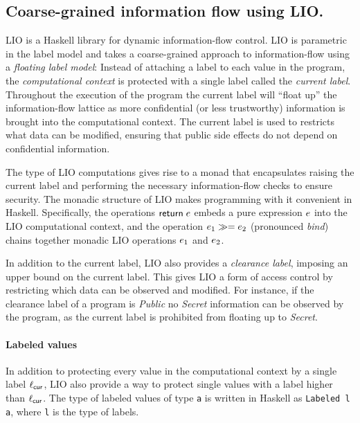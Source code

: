 \subsection{Coarse-grained information flow using LIO.}
LIO \cite{SRMMlio} is a Haskell library for dynamic information-flow control. LIO is parametric in the label model and takes a coarse-grained approach to information-flow using a \emph{floating label model}: Instead of attaching a label to each value in the program, the \emph{computational context} is protected with a single label called the \emph{current label}. Throughout the execution of the program the current label will ``float up'' the information-flow lattice as more confidential (or less trustworthy) information is brought into the computational context. The current label is used to restricts what data can be modified, ensuring that public side effects do not depend on confidential information.

The type of LIO computations gives rise to a monad \cite{Wadler:1995:MFP:647698.734146} that encapsulates raising the current label and performing the necessary information-flow checks to ensure security. The monadic structure of LIO makes programming with it convenient in Haskell. Specifically, the operations $\mathsf{return}\;e$ embeds a pure expression $e$ into the LIO computational context, and the operation $e_1 \gg= e_2$ (pronounced \emph{bind}) chains together monadic LIO operations $e_1$ and $e_2$.

In addition to the current label, LIO also provides a \emph{clearance label}, imposing an upper bound on the current label. This gives LIO a form of access control by restricting which data can be observed and modified. For instance, if the clearance label of a program is \emph{Public} no \emph{Secret} information can be observed by the program, as the current label is prohibited from floating up to \emph{Secret}.

\paragraph{Labeled values}
In addition to protecting every value in the computational context by a single label $\ell_{\mathsf{cur}}$, LIO also provide a way to protect single values with a label higher than $\ell_{\mathsf{cur}}$. The type of labeled values of type \texttt{a} is written in Haskell as \texttt{Labeled l a}, where \texttt{l} is the type of labels.


